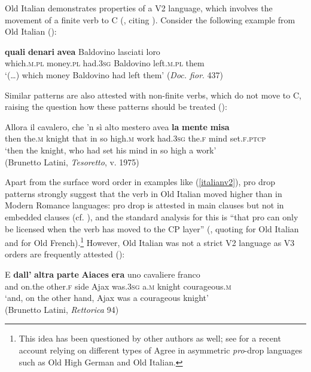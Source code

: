 Old Italian demonstrates properties of a V2 language, which involves the movement of a finite verb to C (\citealt[261--262]{poletto2006}, citing \citealt{beninca1984}). Consider the following example from Old Italian (\citealt[262, ex. 2a]{poletto2006}):

\ea \gll \textbf{quali} \textbf{denari} \textbf{avea} Baldovino lasciati loro \label{italianv2}\\
which.\textsc{m.pl} money.\textsc{pl} had.\textsc{3sg} Baldovino left.\textsc{m.pl} them\\
\glt `(\ldots) which money Baldovino had left them' (\textit{Doc. fior}. 437)
\z

Similar patterns are also attested with non-finite verbs, which do not move to C, raising the question how these patterns should be treated (\citealt[261, ex. 1]{poletto2006}):

\ea \gll Allora il cavalero, che 'n sì alto mestero avea \textbf{la} \textbf{mente} \textbf{misa} \label{lamente}\\
then the.\textsc{m} knight that in so high.\textsc{m} work had.\textsc{3sg} the.\textsc{f} mind set.\textsc{f.ptcp}\\
\glt `then the knight, who had set his mind in so high a work'\\(Brunetto Latini, \textit{Tesoretto}, v. 1975)
\z

Apart from the surface word order in examples like (\ref{italianv2}), pro drop patterns strongly suggest that the verb in Old Italian moved higher than in Modern Romance languages: pro drop is attested in main clauses but not in embedded clauses (cf. \citealt{vanelli1987}), and the standard analysis for this is ``that pro can only be licensed when the verb has moved to the CP layer'' (\citealt[263]{poletto2006}, quoting \citealt{beninca1984} for Old Italian and \citealt{roberts1993} for Old French).\footnote{This idea has been questioned by other authors as well; see \citet{cognolawalkden2019, cognolawalkden2021} for a recent account relying on different types of Agree in asymmetric \textit{pro}-drop languages such as Old High German and Old Italian.} However, Old Italian was not a strict V2 language as V3 orders are frequently attested (\citealt[236, ex. 4a]{poletto2006}):

\ea \gll E \textbf{dall'} \textbf{altra} \textbf{parte} \textbf{Aiaces} \textbf{era} uno cavaliere franco\\
and on.the other.\textsc{f} side Ajax was.\textsc{3sg} a.\textsc{m} knight courageous.\textsc{m}\\
\glt `and, on the other hand, Ajax was a courageous knight'\\(Brunetto Latini, \textit{Rettorica} 94)
\z

